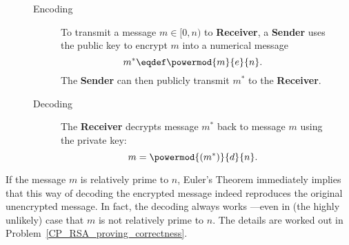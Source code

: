 \begin{figure}[p]
{\begin{minipage}{\textwidth}
\begin{description}
\item[Encoding]

\iffalse

Given a message~$m$, the sender first checks that $\gcd(m, n) =
1$.\footnote{It would be very bad if $\gcd(m, n)$ equals $p$ or $q$
  since then it would be easy for someone to use the encoded message
  to compute the private key If $\gcd(m, n) = n$, then the encoded
  message would be~0, which is fairly useless.  For very large values
  of~$n$, it is extremely unlikely that $\gcd(m, n) \ne 1$.  If this
  does happen, you should get a new set of keys or, at the very least,
  add some bits to~$m$ so that the resulting message is relatively
  prime to~$n$.}
\fi

To transmit a message $m \in [0,n)$ to \textbf{Receiver}, a \textbf{Sender} uses the public
  key to encrypt $m$ into a numerical message
\[
m^* \eqdef \powermod{m}{e}{n}.
\]
The \textbf{Sender} can then publicly transmit $m^*$ to the \textbf{Receiver}.

\item[Decoding] The \textbf{Receiver} decrypts message $m^*$ back to message $m$ using the
  private key:
\[
m = \powermod{(m^*)}{d}{n}.
\]
\end{description}

\end{minipage}
}
\end{figure}

If the message $m$ is relatively prime to $n$, Euler's Theorem
immediately implies that this way of decoding the encrypted message
indeed reproduces the original unencrypted message.  In fact, the
decoding always works ---even in (the highly unlikely) case that $m$
is not relatively prime to $n$.  The details are worked out in
Problem~\ref{CP_RSA_proving_correctness}.

